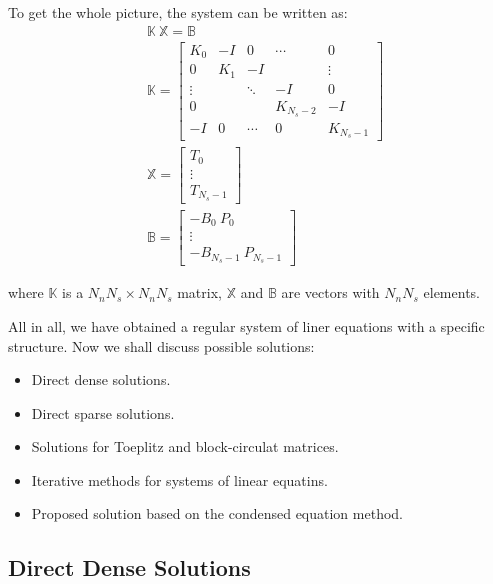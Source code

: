 To get the whole picture, the system can be written as:
\begin{align}
  & \mathbb{K} \: \mathbb{X} = \mathbb{B} \label{eq:system} \\
  & \mathbb{K} = \left[
    \begin{array}{ccccc}
      K_0 & -I & 0 & \cdots & 0 \\
      0 & K_1 & -I &  & \vdots \\
      \vdots &  & \ddots & -I & 0 \\
      0 &  &  & K_{N_s - 2} & -I \\
      -I & 0 & \cdots & 0 & K_{N_s - 1}
    \end{array}
  \right] \nonumber \\
  & \mathbb{X} = \left[
    \begin{array}{c}
      T_0 \\
      \vdots \\
      T_{N_s - 1}
    \end{array}
  \right] \nonumber \\
  & \mathbb{B} = \left[
    \begin{array}{c}
      -B_0 \: P_0 \\
      \vdots \\
      -B_{N_s - 1} \: P_{N_s - 1}
    \end{array}
  \right] \nonumber
\end{align}

where $\mathbb{K}$ is a $N_n N_s \times N_n N_s$ matrix, $\mathbb{X}$ and $\mathbb{B}$ are vectors with $N_n N_s$ elements.

All in all, we have obtained a regular system of liner equations with a specific structure. Now we shall discuss possible solutions:
\begin{itemize}
  \item Direct dense solutions.
  \item Direct sparse solutions.
  \item Solutions for Toeplitz and block-circulat matrices.
  \item Iterative methods for systems of linear equatins.
  \item Proposed solution based on the condensed equation method.
\end{itemize}

\subsection{Direct Dense Solutions}


